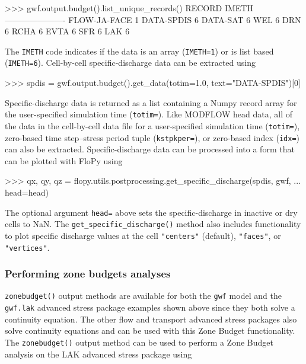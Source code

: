 \documentclass[11pt, oneside]{article}  	%
\begin{document}
\begin{python}
>>> gwf.output.budget().list_unique_records()
RECORD           IMETH
----------------------
FLOW-JA-FACE         1
DATA-SPDIS           6
DATA-SAT             6
WEL                  6
DRN                  6
RCHA                 6
EVTA                 6
SFR                  6
LAK                  6
\end{python}

\noindent The \texttt{IMETH} code indicates if the data is an array (\texttt{IMETH=1}) or is list based (\texttt{IMETH=6}). Cell-by-cell specific-discharge data can be extracted using

\begin{python}
>>> spdis = gwf.output.budget().get_data(totim=1.0, text="DATA-SPDIS")[0]
\end{python}

\noindent Specific-discharge data is returned as a list containing a Numpy record array for the user-specified simulation time (\texttt{totim=}). Like MODFLOW head data, all of the data in the cell-by-cell data file for a user-specified simulation time (\texttt{totim=}), zero-based time step--stress period tuple (\texttt{kstpkper=}), or zero-based index (\texttt{idx=}) can also be extracted. Specific-discharge data can be processed into a form that can be plotted with FloPy using 

\begin{python}
>>> qx, qy, qz = flopy.utils.postprocessing.get_specific_discharge(spdis, gwf, 
... head=head)
\end{python}

\noindent The optional argument \texttt{head=} above sets the specific-discharge in inactive or dry cells to NaN. The \texttt{get\_specific\_discharge()} method also includes functionality to plot specific discharge values at the cell \texttt{"centers"} (default), \texttt{"faces"}, or \texttt{"vertices"}. 

\subsubsection{Performing zone budgets analyses}

\texttt{zonebudget()} output methods are available for both the \texttt{gwf} model and the \texttt{gwf.lak} advanced stress package examples shown above since they both solve a continuity equation. The other flow and transport advanced stress packages also solve continuity equations and can be used with this Zone Budget functionality.  The \texttt{zonebudget()} output method can be used to perform a Zone Budget analysis on the LAK advanced stress package using
\end{document}
